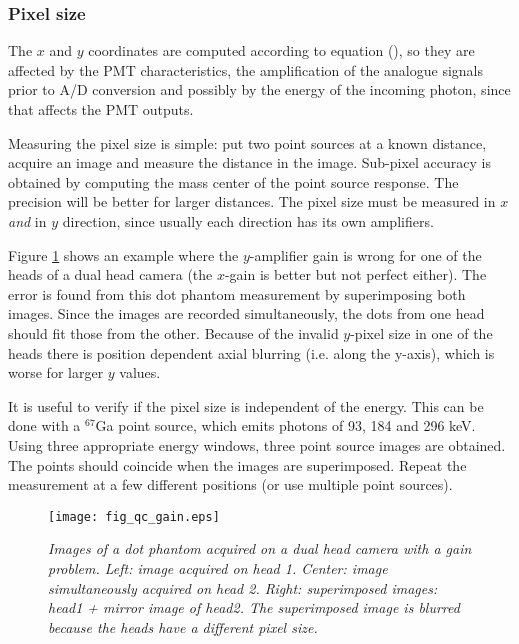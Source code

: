 \subsubsection{Pixel size}
The $x$ and $y$ coordinates are computed according to equation
(), so they are affected by the PMT characteristics, the
amplification of the analogue signals prior to A/D conversion and possibly by
the energy of the incoming photon, since that affects the PMT outputs.

Measuring the pixel size is simple: put two point sources at a known distance,
acquire an image and measure the distance in the image. Sub-pixel accuracy is
obtained by computing the mass center of the point source response. The
precision will be better for larger distances. The pixel size must be measured
in $x$ {\em and} in $y$ direction, since usually each direction has its own
amplifiers.

Figure \ref{fig:qc_gain} shows an example where the $y$-amplifier gain
is wrong for one of the heads of a dual head camera (the $x$-gain is
better but not perfect either). The error is found from this dot
phantom measurement by superimposing both images. Since the images are
recorded simultaneously, the dots from one head should fit those from
the other. Because of the invalid $y$-pixel size in one of the heads
there is position dependent axial blurring (i.e. along the y-axis),
which is worse for larger $y$ values.

It is useful to verify if the pixel size is independent of the energy. This
can be done with a $^{67}$Ga point source, which emits photons of 93, 184 and
296 keV. Using three appropriate energy windows, three point source images are
obtained. The points should coincide when the images are superimposed. Repeat
the measurement at a few different positions (or use multiple point sources).

\begin{figure}[tb]
\centering
\texttt{[image: fig\_qc\_gain.eps]}
\caption{\label{fig:qc_gain} \emph{Images of a dot phantom acquired on a dual
head camera with a gain problem. Left: image acquired on head 1. Center: image
simultaneously acquired on head 2. Right: superimposed images: head1 + mirror
image of head2. The superimposed image is blurred because the heads have a
different pixel size.}}
\end{figure}


